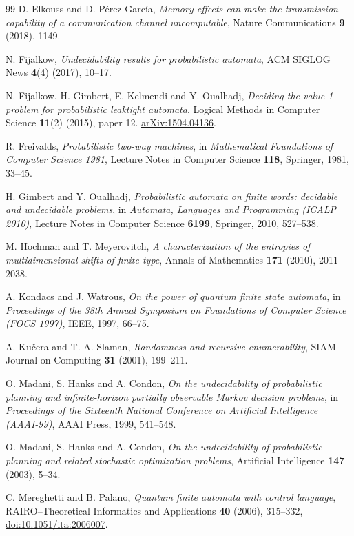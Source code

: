 \documentclass[11pt]{article}
\theoremstyle{plain}
\theoremstyle{definition}
\theoremstyle{remark}
\begin{document}
\begin{thebibliography}{99}
D. Elkouss and D. P\'erez-Garc\'ia, \emph{Memory effects can make the transmission capability of a communication channel uncomputable}, Nature Communications \textbf{9} (2018), 1149.

N. Fijalkow, \emph{Undecidability results for probabilistic automata}, ACM SIGLOG News \textbf{4}(4) (2017), 10--17.

N. Fijalkow, H. Gimbert, E. Kelmendi and Y. Oualhadj, \emph{Deciding the value 1 problem for probabilistic leaktight automata}, Logical Methods in Computer Science \textbf{11}(2) (2015), paper 12.
\href{https://arxiv.org/abs/1504.04136}{arXiv:1504.04136}.

R. Freivalds, \emph{Probabilistic two-way machines}, in \emph{Mathematical Foundations of Computer Science 1981}, Lecture Notes in Computer Science \textbf{118}, Springer, 1981, 33--45.

H. Gimbert and Y. Oualhadj, \emph{Probabilistic automata on finite words: decidable and undecidable problems}, in \emph{Automata, Languages and Programming (ICALP 2010)}, Lecture Notes in Computer Science \textbf{6199}, Springer, 2010, 527--538.

M. Hochman and T. Meyerovitch, \emph{A characterization of the entropies of multidimensional shifts of finite type}, Annals of Mathematics \textbf{171} (2010), 2011--2038.

A. Kondacs and J. Watrous, \emph{On the power of quantum finite state automata}, in \emph{Proceedings of the 38th Annual Symposium on Foundations of Computer Science (FOCS 1997)}, IEEE, 1997, 66--75.

A. Ku\v{c}era and T. A. Slaman, \emph{Randomness and recursive enumerability}, SIAM Journal on Computing \textbf{31} (2001), 199--211.

O. Madani, S. Hanks and A. Condon, \emph{On the undecidability of probabilistic planning and infinite-horizon partially observable Markov decision problems}, in \emph{Proceedings of the Sixteenth National Conference on Artificial Intelligence (AAAI-99)}, AAAI Press, 1999, 541--548.

O. Madani, S. Hanks and A. Condon, \emph{On the undecidability of probabilistic planning and related stochastic optimization problems}, Artificial Intelligence \textbf{147} (2003), 5--34.

C. Mereghetti and B. Palano, \emph{Quantum finite automata with control language}, RAIRO--Theoretical Informatics and Applications \textbf{40} (2006), 315--332, \href{https://doi.org/10.1051/ita:2006007}{doi:10.1051/ita:2006007}.


\end{thebibliography}
\end{document}
